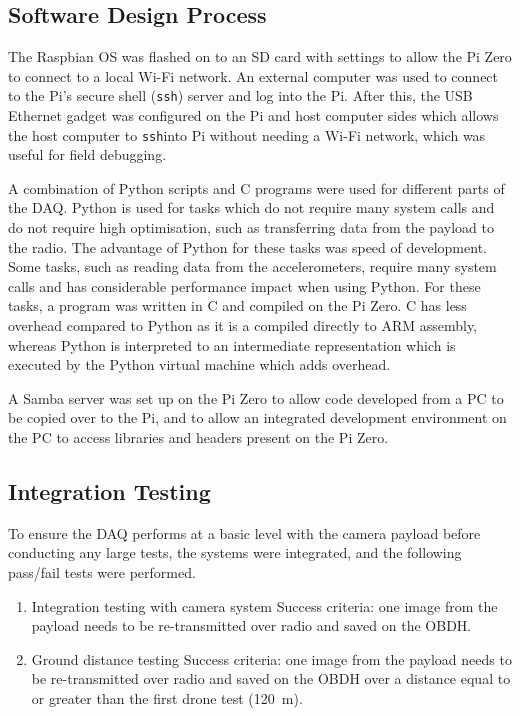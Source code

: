 \documentclass{report}
\newcommand{\ssh}{\texttt{ssh}}
\begin{document}
\subsection{Software Design Process}

The Raspbian OS was flashed on to an SD card with settings to allow the Pi Zero to connect to a local Wi-Fi network. An external computer was used to connect to the Pi's secure shell (\ssh) server and log into the Pi. After this, the USB Ethernet gadget was configured on the Pi and host computer sides which allows the host computer to \ssh into Pi without needing a Wi-Fi network, which was useful for field debugging.

A combination of Python scripts and C programs were used for different parts of the DAQ. Python is used for tasks which do not require many system calls and do not require high optimisation, such as transferring data from the payload to the radio. The advantage of Python for these tasks was speed of development.  Some tasks, such as reading data from the accelerometers, require many system calls and has considerable performance impact when using Python. For these tasks, a program was written in C and compiled on the Pi Zero. C has less overhead compared to Python as it is a compiled directly to ARM assembly, whereas Python is interpreted to an intermediate representation which is executed by the Python virtual machine which adds overhead.

A Samba server was set up on the Pi Zero to allow code developed from a PC to be copied over to the Pi, and to allow an integrated development environment on the PC to access libraries and headers present on the Pi Zero.

\subsection{Integration Testing}

To ensure the DAQ performs at a basic level with the camera payload before conducting any large tests, the systems were integrated, and the following pass/fail tests were performed.

\begin{enumerate}
  \item Integration testing with camera system %
        \subitem Success criteria: one image from the payload needs to be re-transmitted over radio and saved on the OBDH.
  \item Ground distance testing %
        \subitem Success criteria: one image from the payload needs to be re-transmitted over radio and saved on the OBDH over a distance equal to or greater than the first drone test (\SI{120}{\metre}).
\end{enumerate}
\end{document}
